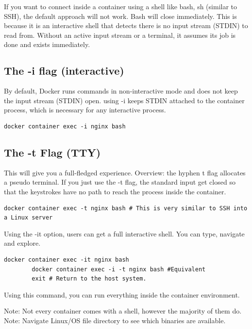 \documentclass[11pt]{book}
\begin{document}
    If you want to connect inside a container using a shell like bash, sh (similar to SSH), the default approach will not work.
    Bash will close immediately.
    This is because it is an interactive shell that detects there is no input stream (STDIN) to read from.
    Without an active input stream or a terminal, it assumes its job is done and exists immediately.

    \subsection{The -i flag (interactive)}
    By default, Docker runs commands in non-interactive mode and does not keep the input stream (STDIN) open.
    using -i keeps STDIN attached to the container process, which is necessary for any interactive process.

    \begin{lstlisting}[style=terminal]
        docker container exec -i nginx bash
    \end{lstlisting}

    \subsection{The -t Flag (TTY)}
    This will give you a full-fledged experience.
    Overview: the hyphen t flag allocates a pseudo terminal.
    If you just use the -t flag, the standard input get closed so that the keystrokes have no path to reach the process inside the container.

    \begin{lstlisting}[style=terminal]
        docker container exec -t nginx bash # This is very similar to SSH into a Linux server
    \end{lstlisting}

    Using the -it option, users can get a full interactive shell.
    You can type, navigate and explore.

    \begin{lstlisting}[style=terminal]
        docker container exec -it nginx bash
        docker container exec -i -t nginx bash #Equivalent
        exit # Return to the host system.
    \end{lstlisting}

    Using this command, you can run everything inside the container environment.

    Note: Not every container comes with a shell, however the majority of them do.
    Note: Navigate Linux/OS file directory to see which binaries are available.
\end{document}

